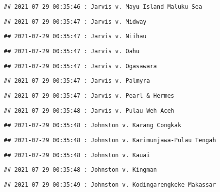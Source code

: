 \documentclass[
]{article}
\begin{document}
\begin{verbatim}
## 2021-07-29 00:35:46 : Jarvis v. Mayu Island Maluku Sea
\end{verbatim}

\begin{verbatim}
## 2021-07-29 00:35:47 : Jarvis v. Midway
\end{verbatim}

\begin{verbatim}
## 2021-07-29 00:35:47 : Jarvis v. Niihau
\end{verbatim}

\begin{verbatim}
## 2021-07-29 00:35:47 : Jarvis v. Oahu
\end{verbatim}

\begin{verbatim}
## 2021-07-29 00:35:47 : Jarvis v. Ogasawara
\end{verbatim}

\begin{verbatim}
## 2021-07-29 00:35:47 : Jarvis v. Palmyra
\end{verbatim}

\begin{verbatim}
## 2021-07-29 00:35:47 : Jarvis v. Pearl & Hermes
\end{verbatim}

\begin{verbatim}
## 2021-07-29 00:35:48 : Jarvis v. Pulau Weh Aceh
\end{verbatim}

\begin{verbatim}
## 2021-07-29 00:35:48 : Johnston v. Karang Congkak
\end{verbatim}

\begin{verbatim}
## 2021-07-29 00:35:48 : Johnston v. Karimunjawa-Pulau Tengah
\end{verbatim}

\begin{verbatim}
## 2021-07-29 00:35:48 : Johnston v. Kauai
\end{verbatim}

\begin{verbatim}
## 2021-07-29 00:35:48 : Johnston v. Kingman
\end{verbatim}

\begin{verbatim}
## 2021-07-29 00:35:49 : Johnston v. Kodingarengkeke Makassar
\end{verbatim}
\end{document}
